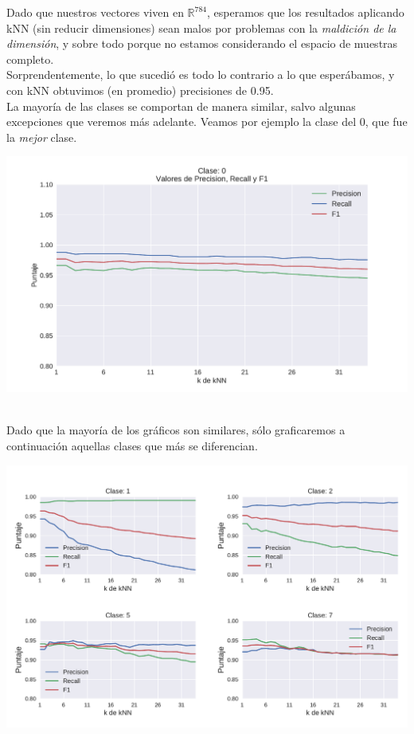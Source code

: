 Dado que nuestros vectores viven en $\mathbb{R}^{784}$, esperamos que los resultados aplicando kNN (sin reducir dimensiones) sean malos por problemas con la \textit{maldición de la dimensión}, y sobre todo porque no estamos considerando el espacio de muestras completo. \\

Sorprendentemente, lo que sucedió es todo lo contrario a lo que esperábamos, y con kNN obtuvimos (en promedio) precisiones de 0.95. \\

La mayoría de las clases se comportan de manera similar, salvo algunas excepciones que veremos más adelante. Veamos por ejemplo la clase del 0, que fue la \textit{mejor} clase.

{\centering
    \includegraphics[scale=0.55]{informe/imagenes/knn/precisionClase0.pdf} \\
}
$ $\newline

Dado que la mayoría de los gráficos son similares, sólo graficaremos a continuación aquellas clases que más se diferencian.

{\centering
    \includegraphics[scale=0.70]{informe/imagenes/knn/precisionClase1257.pdf} \\
    \label{fig:knnclasesvariacion}
}
$ $\newline

